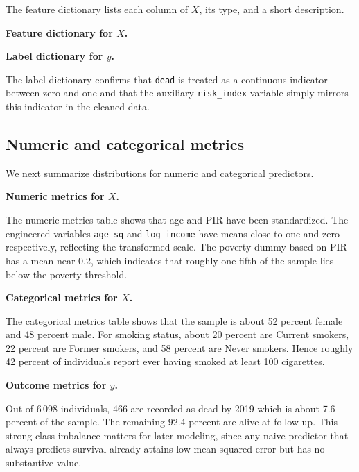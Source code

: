 \documentclass{article}
\begin{document}
The feature dictionary lists each column of \(X\), its type, and a short description.

\medskip
\noindent\textbf{Feature dictionary for \(X\).}
\par


\medskip
\noindent\textbf{Label dictionary for \(y\).}
\par


The label dictionary confirms that \texttt{dead} is treated as a continuous indicator between zero and one and that the auxiliary \texttt{risk\_index} variable simply mirrors this indicator in the cleaned data.

\subsection*{Numeric and categorical metrics}

We next summarize distributions for numeric and categorical predictors.

\medskip
\noindent\textbf{Numeric metrics for \(X\).}
\par


The numeric metrics table shows that age and PIR have been standardized. The engineered variables \texttt{age\_sq} and \texttt{log\_income} have means close to one and zero respectively, reflecting the transformed scale. The poverty dummy based on PIR has a mean near 0.2, which indicates that roughly one fifth of the sample lies below the poverty threshold.

\medskip
\noindent\textbf{Categorical metrics for \(X\).}
\par


The categorical metrics table shows that the sample is about 52 percent female and 48 percent male. For smoking status, about 20 percent are Current smokers, 22 percent are Former smokers, and 58 percent are Never smokers. Hence roughly 42 percent of individuals report ever having smoked at least 100 cigarettes.

\medskip
\noindent\textbf{Outcome metrics for \(y\).}
\par


Out of 6\,098 individuals, 466 are recorded as dead by 2019 which is about 7.6 percent of the sample. The remaining 92.4 percent are alive at follow up. This strong class imbalance matters for later modeling, since any naive predictor that always predicts survival already attains low mean squared error but has no substantive value.
\end{document}
